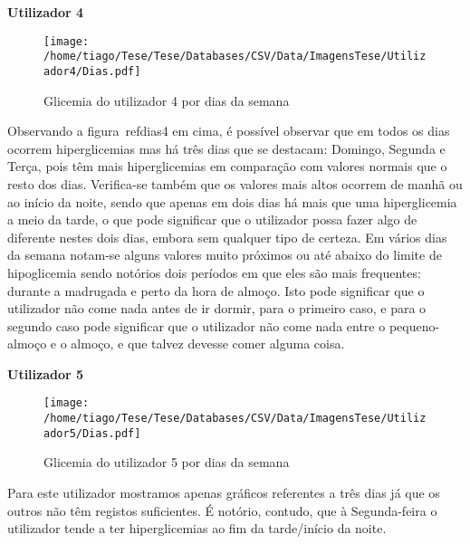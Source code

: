 \textbf{Utilizador 4}

\begin{figure}[H]
\centering
\texttt{[image: /home/tiago/Tese/Tese/Databases/CSV/Data/ImagensTese/Utilizador4/Dias.pdf]}
\caption{Glicemia do utilizador 4 por dias da semana}
\label{fig:dias4}
\end{figure}
Observando a figura~ref{dias4} em cima, é possível observar que em todos os dias ocorrem hiperglicemias mas há três dias que se destacam: Domingo, Segunda e Terça, pois têm mais hiperglicemias em comparação com valores normais que o resto dos dias. Verifica-se também que os valores mais altos ocorrem de manhã ou ao início da noite, sendo que apenas em dois dias há mais que uma hiperglicemia a meio da tarde, o que pode significar que o utilizador possa fazer algo de diferente nestes dois dias, embora sem qualquer tipo de certeza. 
Em vários dias da semana notam-se alguns valores muito próximos ou até abaixo do limite de hipoglicemia sendo notórios dois períodos em que eles são mais frequentes: durante a madrugada e perto da hora de almoço. Isto pode significar que o utilizador não come nada antes de ir dormir, para o primeiro caso, e para o segundo caso pode significar que o utilizador não come nada entre o pequeno-almoço e o almoço, e que talvez devesse comer alguma coisa. 


\textbf{Utilizador 5}

\begin{figure}[H]
\centering
\texttt{[image: /home/tiago/Tese/Tese/Databases/CSV/Data/ImagensTese/Utilizador5/Dias.pdf]}
\caption{Glicemia do utilizador 5 por dias da semana}
\label{fig:dias5}
\end{figure}
Para este utilizador mostramos apenas gráficos referentes a três dias já que os outros não têm registos suficientes. É notório, contudo, que à Segunda-feira o utilizador tende a ter hiperglicemias ao fim da tarde/início da noite. 




